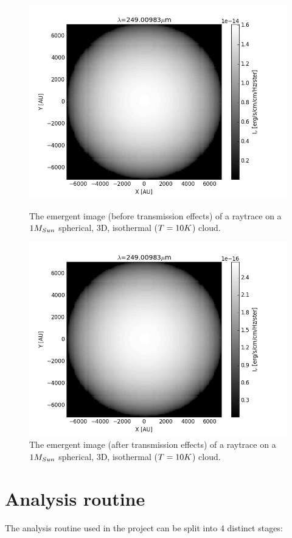 \documentclass{report}
\begin{document}
\begin{figure}[!htb]
  \includegraphics[width=\linewidth]{../img/figure_1_no_trans.png}
  \caption{The emergent image (before transmission effects) of a raytrace on a $1\/M_{Sun}$ spherical, 3D, isothermal ($T=10\/K$) cloud.}\label{fig:no-trans}
\endminipage\hfill
{}
  \includegraphics[width=\linewidth]{../img/figure_1.png}
  \caption{The emergent image (after transmission effects) of a raytrace on a $1\/M_{Sun}$ spherical, 3D, isothermal ($T=10\/K$) cloud.}\label{fig:trans}
\endminipage
\end{figure}

\section{Analysis routine}
The analysis routine used in the project can be split into 4 distinct stages:
\end{document}
